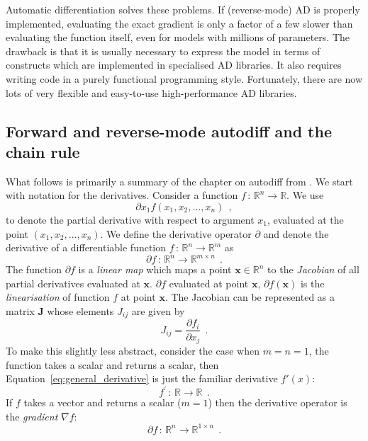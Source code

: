 \documentclass[12pt,dvipsnames]{report}
\renewcommand{\vec}[1]{\boldsymbol{\mathbf{#1}}}
\newcommand{\hquad}{~~}
\begin{document}
Automatic differentiation solves these problems. If (reverse-mode) AD is properly implemented,
evaluating the exact gradient is only a factor of a few slower than evaluating 
the function itself, even for models with millions of parameters.
The drawback is that it is usually
necessary to express the model in terms of constructs which are implemented in 
specialised AD libraries. It also requires writing code in a purely functional programming 
style. Fortunately, there are now lots of very flexible 
and easy-to-use high-performance AD libraries. 

\subsection{Forward and reverse-mode autodiff and the chain rule}
What follows is primarily a summary of the chapter on autodiff 
from \citet{murphy_book_2023}. We start with notation for the derivatives.
Consider a function $f\,:\,\mathbb{R}^{n} \rightarrow \mathbb{R}$. We use 
\begin{equation}
\partial x_1 f\left(x_{1}, x_{2}, \ldots, x_{n}\right)
\hquad,
\end{equation} 
to denote the partial derivative with respect to argument $x_1$,
evaluated at the point $(x_{1}, x_{2}, \ldots, x_{n})$.
We define the derivative operator $\partial$ and denote the derivative of a 
differentiable function $f\,:\,\mathbb{R}^{n} \rightarrow \mathbb{R}^m$ as 
\begin{equation}
    \partial f\,:\,\mathbb{R}^{n} \rightarrow \mathbb{R}^{m\times n}
    \hquad.
    \label{eq:general_derivative}
\end{equation}
The function $\partial f$ is a \emph{linear map} which maps a point 
$\vec x\in \mathbb{R}^n$ to the \emph{Jacobian} of all partial derivatives 
evaluated at $\vec x$.  $\partial f$ evaluated at point $\vec x$,
$\partial f (\vec x)$ is the \emph{linearisation} of function $f$ at point $\vec x$.
The Jacobian can be represented as a matrix $\vec J$ whose 
elements $J_{ij}$ are given by 
\begin{equation}
J_{i j}=\frac{\partial f_{i}}{\partial x_{j}}
\hquad.
\end{equation}
  To make this slightly less abstract, consider the case when
$m=n=1$, the function takes a scalar and returns a scalar, then 
Equation~\ref{eq:general_derivative} is just the familiar derivative $f'(x)$:
\begin{equation}
    f^\prime\,:\,\mathbb{R} \rightarrow \mathbb{R}
    \hquad.
\end{equation}
If $f$ takes a vector and returns a scalar ($m=1$) then the derivative operator is 
the \emph{gradient} $\nabla f$:
\begin{equation}
    \partial f\,:\,\mathbb{R}^{n} \rightarrow \mathbb{R}^{1\times n}
    \hquad.
\end{equation}
\end{document}
